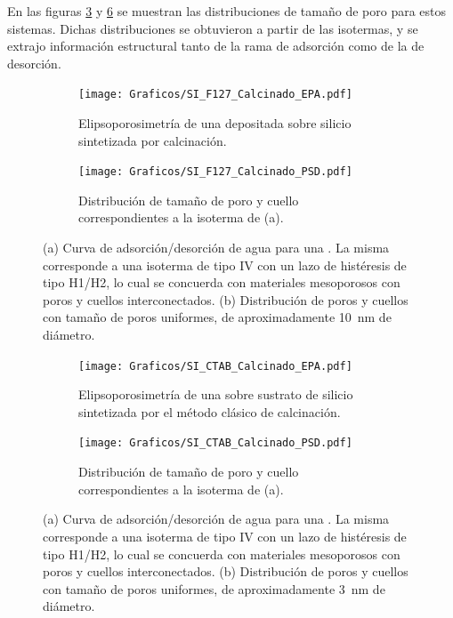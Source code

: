 		 En las figuras \ref{fig:F127_PSD} y \ref{fig:CTAB_PSD} se muestran las distribuciones de tamaño de poro para estos sistemas. Dichas distribuciones se obtuvieron a partir de las isotermas, y se extrajo información estructural tanto de la rama de adsorción como de la de desorción.


		     	  	\begin{figure}[!ht]
		     	  		\begin{subfigure}[t]{0.495\textwidth}
		     	  		\texttt{[image: Graficos/SI\_F127\_Calcinado\_EPA.pdf]}
						\caption{Elipsoporosimetría de una \pdmF\space depositada sobre silicio sintetizada por calcinación.}
						\label{fig:F127_EPA}
						\end{subfigure}
						\begin{subfigure}[t]{0.495\textwidth}
		     	  		\texttt{[image: Graficos/SI\_F127\_Calcinado\_PSD.pdf]}
						\caption{Distribución de tamaño de poro y cuello correspondientes a la isoterma de (a).}
						\label{fig:F127_PSD}
						\end{subfigure}
						\caption[Elipsoporosimetría para sistemas \pdmF.]{(a) Curva de adsorción/desorción de agua para una \pdmF\space. La misma corresponde a una isoterma de tipo IV con un lazo de histéresis de tipo H1/H2, lo cual se concuerda con materiales mesoporosos con poros y cuellos interconectados. (b) Distribución de poros y cuellos con tamaño de poros uniformes, de aproximadamente \SI{10}{\nm} de diámetro.}
						\end{figure}
					\begin{figure}[!ht]
		     	  		\begin{subfigure}[t]{0.495\textwidth}
		     	  		\texttt{[image: Graficos/SI\_CTAB\_Calcinado\_EPA.pdf]}
						\caption{Elipsoporosimetría de una \pdmF\space sobre sustrato de silicio sintetizada por el método clásico de calcinación.}
						\label{fig:CTAB_EPA}
						\end{subfigure}
						\begin{subfigure}[t]{0.495\textwidth}
		     	  		\texttt{[image: Graficos/SI\_CTAB\_Calcinado\_PSD.pdf]}
						\caption{Distribución de tamaño de poro y cuello correspondientes a la isoterma de (a).}
						\label{fig:CTAB_PSD}
						\end{subfigure}
						\caption[Elipsoporosimetría para sistemas \pdmC.]{(a) Curva de adsorción/desorción de agua para una \pdmC\space . La misma corresponde a una isoterma de tipo IV con un lazo de histéresis de tipo H1/H2, lo cual se concuerda con materiales mesoporosos con poros y cuellos interconectados. (b) Distribución de poros y cuellos con tamaño de poros uniformes, de aproximadamente \SI{3}{\nm} de diámetro.}
						\end{figure}	
		

